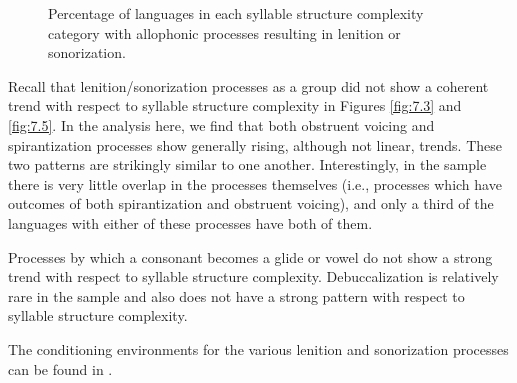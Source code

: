 \begin{figure}
\caption{\label{fig:7.10}Percentage of languages in each syllable structure complexity category with allophonic processes resulting in lenition or sonorization.}
\end{figure}
  Recall that lenition/sonorization processes as a group did not show a coherent trend with respect to syllable structure complexity in Figures \ref{fig:7.3} and \ref{fig:7.5}. In the analysis here, we find that both obstruent voicing and spirantization processes show generally rising, although not linear, trends. These two patterns are strikingly similar to one another. Interestingly, in the sample there is very little overlap in the processes themselves (i.e., processes which have outcomes of both spirantization and obstruent voicing), and only a third of the languages with either of these processes have both of them.

  Processes by which a consonant becomes a glide or vowel do not show a strong trend with respect to syllable structure complexity. Debuccalization is relatively rare in the sample and also does not have a strong pattern with respect to syllable structure complexity.

  The conditioning environments for the various lenition and sonorization processes can be found in .

